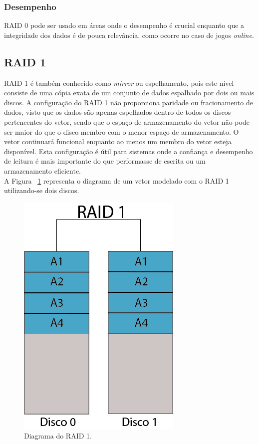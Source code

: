 \subsubsection{Desempenho}

RAID 0 pode ser usado em áreas onde o desempenho é crucial enquanto que a integridade dos dados é de pouca relevância, como ocorre no caso de jogos \textit{online}.\\

\subsection{RAID 1}

RAID 1 é também conhecido como \textit{mirror} ou espelhamento, pois este nível consiste de uma cópia exata de um conjunto de dados espalhado por dois ou mais discos. A configuração do RAID 1 não proporciona paridade ou fracionamento de dados, visto que os dados são apenas espelhados dentro de todos os discos pertencentes do vetor, sendo que o espaço de armazenamento do vetor não pode ser maior do que o disco membro com o menor espaço de armazenamento. O vetor continuará funcional enquanto ao menos um membro do vetor esteja disponível. Esta configuração é útil para sistemas onde a confiança e desempenho de leitura é mais importante do que performasse de escrita ou um armazenamento eficiente. \\

A Figura ~\ref{fig:raid1} representa o diagrama de um vetor modelado com o RAID 1 utilizando-se dois discos.\\

\begin{figure}[htb]
	\begin{center}
		
		\includegraphics[clip,scale=0.5]{images/RAID_1.png}
		\caption{Diagrama do RAID 1. }
		\label{fig:raid1}
	\end{center}
\end{figure} 


